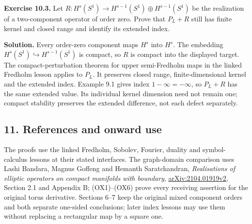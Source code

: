 \documentclass[
  11pt,
]{article}
\makeatletter
\let\ReaderOriginalAnchorStart\hyper@anchorstart
\let\ReaderOriginalAnchorEnd\hyper@anchorend
\let\ReaderPendingAliases\@empty
\def\ReaderArmAliases#1{\gdef\ReaderPendingAliases{#1}}
\def\hyper@anchorstart#1{\ReaderIfNativeAnchorTF{#1}{\ReaderPendingAliases\global\let\ReaderPendingAliases\@empty}{}\ReaderOriginalAnchorStart{#1}}
\makeatother
\begin{document}
\textbf{Exercise 10.3.} Let
\(R:H^s(S^1)\to H^{s-1}(S^1)\oplus H^{s-1}(S^1)\) be the realization of
a two-component operator of order zero. Prove that \(P_L+R\) still has
finite kernel and closed range and identify its extended index.

\textbf{Solution.} Every order-zero component maps \(H^s\) into \(H^s\).
The embedding \(H^s(S^1)\hookrightarrow H^{s-1}(S^1)\) is compact, so
\(R\) is compact into the displayed target. The compact-perturbation
theorem for upper semi-Fredholm maps in the linked Fredholm lesson
applies to \(P_L\). It preserves closed range, finite-dimensional kernel
and the extended index. Example 9.1 gives index \(1-\infty=-\infty\), so
\(P_L+R\) has the same extended value. Its individual kernel dimension
need not remain one; compact stability preserves the extended
difference, not each defect separately.

\ReaderArmAliases{\ReaderOriginalAnchorStart{AN03-OMF-011}\ReaderOriginalAnchorEnd\begingroup\expandafter\def\csname @currentHref\endcsname{AN03-OMF-011}\label{AN03-OMF-011}\endgroup\ReaderOriginalAnchorStart{11-references-and-onward-use}\ReaderOriginalAnchorEnd\begingroup\expandafter\def\csname @currentHref\endcsname{11-references-and-onward-use}\label{11-references-and-onward-use}\endgroup}
\subsection{11. References and onward
use}\label{references-and-onward-use}

The proofs use the linked Fredholm, Sobolev, Fourier, duality and
symbol-calculus lessons at their stated interfaces. The graph-domain
comparison uses Lashi Bandara, Magnus Goffeng and Hemanth Saratchandran,
\emph{Realisations of elliptic operators on compact manifolds with
boundary},
\href{https://arxiv.org/abs/2104.01919v2}{arXiv:2104.01919v2}, Section
2.1 and Appendix B; (OX1)--(OX6) prove every receiving assertion for the
original torus derivative. Sections 6--7 keep the original mixed
component orders and both separate one-sided conclusions; later index
lessons may use them without replacing a rectangular map by a square
one.
\end{document}
